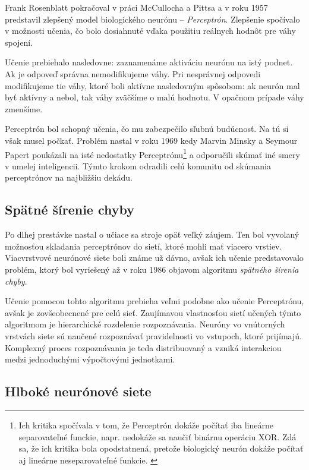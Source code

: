 Frank Rosenblatt pokračoval v práci McCullocha a Pittsa a v roku 1957 predstavil zlepšený model biologického neurónu -- \emph{Perceptrón}. Zlepšenie spočívalo v možnosti učenia, čo bolo dosiahnuté vďaka použitiu reálnych hodnôt pre váhy spojení.

Učenie prebiehalo nasledovne: zaznamenáme aktiváciu neurónu na istý podnet. Ak je odpoveď správna nemodifikujeme váhy. Pri nesprávnej odpovedi modifikujeme tie váhy, ktoré boli aktívne nasledovným spôsobom: ak neurón mal byť aktívny a nebol, tak váhy zväčšíme o malú hodnotu. V opačnom prípade váhy zmenšíme.

Perceptrón bol schopný učenia, čo mu zabezpečilo sľubnú budúcnosť. Na tú si však musel počkať. Problém nastal v roku 1969 kedy Marvin Minsky a Seymour Papert poukázali na isté nedostatky Perceptrónu\footnote{Ich kritika spočívala v tom, že Perceptrón dokáže počítať iba lineárne separovateľné funckie, napr. nedokáže sa naučiť binárnu operáciu XOR. Zdá sa, že ich kritika bola opodstatnená, pretože biologický neurón dokáže počítať aj lineárne neseparovateľné funkcie.  \autocite{Caze2013}}
 a odporučili skúmať iné smery v umelej inteligencii. Týmto krokom odradili celú komunitu od skúmania perceptrónov na najbližšiu dekádu.

\subsection{Spätné šírenie chyby}

Po dlhej prestávke nastal o učiace sa stroje opäť veľký záujem. Ten bol vyvolaný možnosťou skladania perceptrónov do sietí, ktoré mohli mať viacero vrstiev. Viacvrstvové neurónové siete boli známe už dávno, avšak ich učenie predstavovalo problém, ktorý bol vyriešený až v roku 1986 objavom algoritmu \emph{spätného šírenia chyby}.\autocite{Rumelhart1986}

Učenie pomocou tohto algoritmu prebieha veľmi podobne ako učenie Perceptrónu, avšak je zovšeobecnené pre celú sieť. Zaujímavou vlastnosťou sietí učených týmto algoritmom je hierarchické rozdelenie rozpoznávania. Neuróny vo vnútorných vrstvách siete sú naučené rozpoznávať pravidelnosti vo vstupoch, ktoré prijímajú. Komplexný proces rozpoznávania je teda distribuovaný a vzniká interakciou medzi jednoduchými výpočtovými jednotkami.

\subsection{Hlboké neurónové siete}

